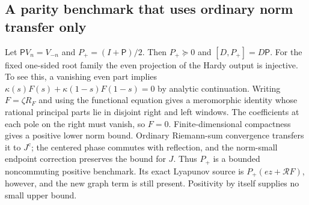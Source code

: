 \documentclass[11pt]{article}
\theoremstyle{remark}
\newcommand{\Jc}{J^{\mathrm c}}
\begin{document}
\subsection*{A parity benchmark that uses ordinary norm transfer only}
Let $\mathsf P V_n=V_{-n}$ and $P_+=(I+\mathsf P)/2$.
Then $P_+\succeq0$ and $[D,P_+]=D\mathsf P$.
For the fixed one-sided root family the even projection of the Hardy
output is injective. To see this, a vanishing even part implies
$\kappa(s)F(s)+\kappa(1-s)F(1-s)=0$ by analytic continuation.
Writing $F=\zeta R_F$ and using the functional equation gives a
meromorphic identity whose rational principal parts lie in disjoint
right and left windows. The coefficients at each pole on the right
must vanish, so $F=0$. Finite-dimensional compactness gives a positive
lower norm bound. Ordinary Riemann-sum convergence transfers it to
$\Jc$; the centered phase commutes with reflection, and the norm-small
endpoint correction preserves the bound for $J$.
Thus $P_+$ is a bounded noncommuting positive benchmark. Its exact
Lyapunov source is $P_+(ez+\mathcal RF)$, however, and the new graph
term is still present. Positivity by itself supplies no small upper bound.
\end{document}

